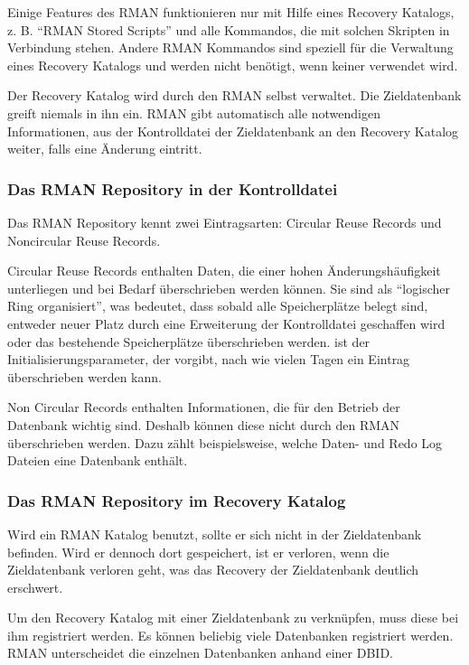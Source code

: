         Einige Features des RMAN funktionieren nur mit Hilfe eines Recovery Katalogs, z. B. \enquote{RMAN Stored Scripts} und alle Kommandos, die mit solchen Skripten in Verbindung stehen. Andere RMAN Kommandos sind speziell für die Verwaltung eines Recovery Katalogs und werden nicht benötigt, wenn keiner verwendet wird.

        Der Recovery Katalog wird durch den RMAN selbst verwaltet. Die Zieldatenbank greift niemals in ihn ein. RMAN gibt automatisch alle notwendigen Informationen, aus der Kontrolldatei der Zieldatenbank an den Recovery Katalog weiter, falls eine Änderung eintritt.
        \subsubsection{Das RMAN Repository in der Kontrolldatei}
          Das RMAN Repository kennt zwei Eintragsarten: Circular Reuse Records und Noncircular Reuse Records.

          Circular Reuse Records enthalten Daten, die einer hohen Änderungshäufigkeit unterliegen und bei Bedarf überschrieben werden können. Sie sind als \enquote{logischer Ring organisiert}, was bedeutet, dass sobald alle Speicherplätze belegt sind, entweder neuer Platz durch eine Erweiterung der Kontrolldatei geschaffen wird oder das bestehende Speicherplätze überschrieben werden.  ist der Initialisierungsparameter, der vorgibt, nach wie vielen Tagen ein Eintrag überschrieben werden kann.

          Non Circular Records enthalten Informationen, die für den Betrieb der Datenbank wichtig sind. Deshalb können diese nicht durch den RMAN überschrieben werden. Dazu zählt beispielsweise, welche Daten- und Redo Log Dateien eine Datenbank enthält.
        \subsubsection{Das RMAN Repository im Recovery Katalog}
         Wird ein RMAN Katalog benutzt, sollte er sich nicht in der Zieldatenbank befinden. Wird er  dennoch dort gespeichert, ist er verloren, wenn die Zieldatenbank verloren geht, was das Recovery der Zieldatenbank deutlich erschwert.

          Um den Recovery Katalog mit einer Zieldatenbank zu verknüpfen, muss diese bei ihm registriert werden. Es können beliebig viele Datenbanken registriert werden. RMAN unterscheidet die einzelnen Datenbanken anhand einer DBID.

